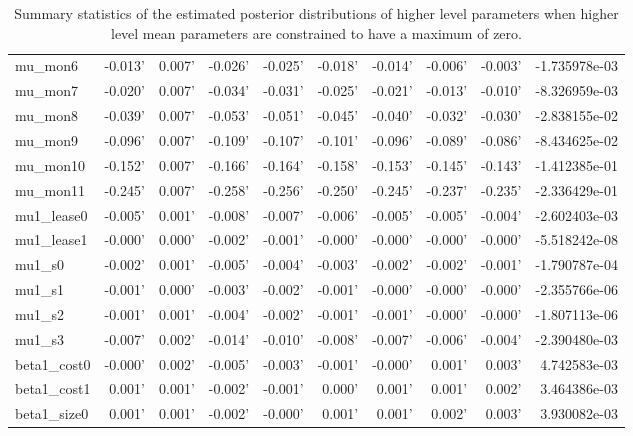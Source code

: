 \documentclass[a4paper]{article}
\begin{document}
\begin{table}
\begin{tabular}{lrrrrrrrrr}
mu\_mon6      & -0.013' & 0.007' & -0.026' & -0.025' & -0.018' & -0.014' & -0.006' & -0.003' & -1.735978e-03 \\
mu\_mon7      & -0.020' & 0.007' & -0.034' & -0.031' & -0.025' & -0.021' & -0.013' & -0.010' & -8.326959e-03 \\
mu\_mon8      & -0.039' & 0.007' & -0.053' & -0.051' & -0.045' & -0.040' & -0.032' & -0.030' & -2.838155e-02 \\
mu\_mon9      & -0.096' & 0.007' & -0.109' & -0.107' & -0.101' & -0.096' & -0.089' & -0.086' & -8.434625e-02 \\
mu\_mon10     & -0.152' & 0.007' & -0.166' & -0.164' & -0.158' & -0.153' & -0.145' & -0.143' & -1.412385e-01 \\
mu\_mon11     & -0.245' & 0.007' & -0.258' & -0.256' & -0.250' & -0.245' & -0.237' & -0.235' & -2.336429e-01 \\
mu1\_lease0   & -0.005' & 0.001' & -0.008' & -0.007' & -0.006' & -0.005' & -0.005' & -0.004' & -2.602403e-03 \\
mu1\_lease1   & -0.000' & 0.000' & -0.002' & -0.001' & -0.000' & -0.000' & -0.000' & -0.000' & -5.518242e-08 \\
mu1\_s0       & -0.002' & 0.001' & -0.005' & -0.004' & -0.003' & -0.002' & -0.002' & -0.001' & -1.790787e-04 \\
mu1\_s1       & -0.001' & 0.000' & -0.003' & -0.002' & -0.001' & -0.000' & -0.000' & -0.000' & -2.355766e-06 \\
mu1\_s2       & -0.001' & 0.001' & -0.004' & -0.002' & -0.001' & -0.001' & -0.000' & -0.000' & -1.807113e-06 \\
mu1\_s3       & -0.007' & 0.002' & -0.014' & -0.010' & -0.008' & -0.007' & -0.006' & -0.004' & -2.390480e-03 \\
beta1\_cost0  & -0.000' & 0.002' & -0.005' & -0.003' & -0.001' & -0.000' &  0.001' &  0.003' &  4.742583e-03 \\
beta1\_cost1  &  0.001' & 0.001' & -0.002' & -0.001' &  0.000' &  0.001' &  0.001' &  0.002' &  3.464386e-03 \\
beta1\_size0  &  0.001' & 0.001' & -0.002' & -0.000' &  0.001' &  0.001' &  0.002' &  0.003' &  3.930082e-03 \\
\bottomrule
\end{tabular}
\label{table:higher_level_params_const}
\caption{Summary statistics of the estimated posterior distributions of higher level parameters when higher level mean parameters are constrained to have a maximum of zero.}
\end{table}
\end{document}
